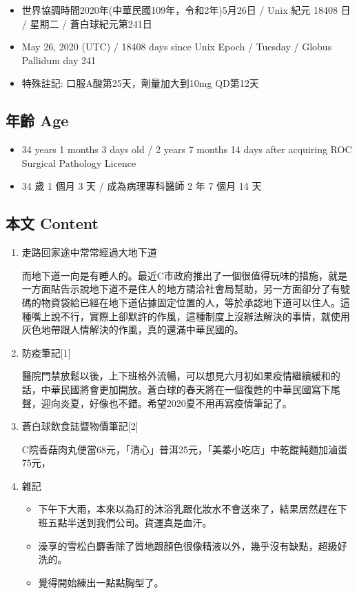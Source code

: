 \documentclass[a5paper, 11pt
]{book}
\providecommand{\tightlist}{%
  \setlength{\itemsep}{0pt}\setlength{\parskip}{0pt}}
\begin{document}
\begin{itemize}
\tightlist
\item
  世界協調時間2020年(中華民國109年，令和2年)5月26日 / Unix 紀元 18408 日
  / 星期二 / 蒼白球紀元第241日
\item
  May 26, 2020 (UTC) / 18408 days since Unix Epoch / Tuesday / Globus
  Pallidum day 241
\item
  特殊註記: 口服A酸第25天，劑量加大到10mg QD第12天
\end{itemize}

\hypertarget{ux5e74ux9f61-age-86}{%
\subsection{年齡 Age}\label{ux5e74ux9f61-age-86}}

\begin{itemize}
\tightlist
\item
  34 years 1 months 3 days old / 2 years 7 months 14 days after
  acquiring ROC Surgical Pathology Licence
\item
  34 歲 1 個月 3 天 / 成為病理專科醫師 2 年 7 個月 14 天
\end{itemize}

\hypertarget{ux672cux6587-content-86}{%
\subsection{本文 Content}\label{ux672cux6587-content-86}}

\begin{enumerate}
\def\labelenumi{\arabic{enumi}.}
\item
  走路回家途中常常經過大地下道

  而地下道一向是有睡人的。最近C市政府推出了一個很值得玩味的措施，就是一方面貼告示說地下道不是住人的地方請洽社會局幫助，另一方面卻分了有號碼的物資袋給已經在地下道佔據固定位置的人，等於承認地下道可以住人。這種嘴上說不行，實際上卻默許的作風，這種制度上沒辦法解決的事情，就使用灰色地帶跟人情解決的作風，真的還滿中華民國的。
\item
  防疫筆記{[}1{]}

  醫院門禁放鬆以後，上下班格外流暢，可以想見六月初如果疫情繼續緩和的話，中華民國將會更加開放。蒼白球的春天將在一個復甦的中華民國寫下尾聲，迎向炎夏，好像也不錯。希望2020夏不用再寫疫情筆記了。
\item
  蒼白球飲食誌暨物價筆記{[}2{]}

  C院香菇肉丸便當68元，「清心」普洱25元，「美蓁小吃店」中乾餛飩麵加滷蛋75元，
\item
  雜記

  \begin{itemize}
  \tightlist
  \item
    下午下大雨，本來以為訂的沐浴乳跟化妝水不會送來了，結果居然趕在下班五點半送到我們公司。貨運真是血汗。
  \item
    澡享的雪松白麝香除了質地跟顏色很像精液以外，幾乎沒有缺點，超級好洗的。
  \item
    覺得開始練出一點點胸型了。
  \end{itemize}
\end{enumerate}
\end{document}
